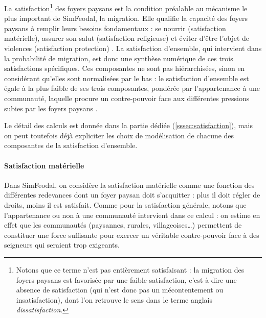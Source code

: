 La satisfaction\footnote{
Notons que ce terme n'est pas entièrement \og satisfaisant\fg{} : la migration des foyers paysans est favorisée par une faible satisfaction, c'est-à-dire une absence de satisfaction (qui n'est donc pas un mécontentement ou \og insatisfaction\fg{}), dont l'on retrouve le sens dans le terme anglais \textit{dissatisfaction}.
} des foyers paysans est la condition préalable au mécanisme le plus important de SimFeodal, la migration.
Elle qualifie la capacité des foyers paysans à remplir leurs besoins fondamentaux : \og se nourrir\fg{} (satisfaction matérielle), \og assurer son salut\fg{} (satisfaction religieuse) et \og éviter d'être l'objet de violences\fg{} (satisfaction \og protection\fg{}) \autocite[Tableau 1, \ppno~309]{cura_transition_2017}.
La satisfaction d'ensemble, qui intervient dans la probabilité de migration, est donc une synthèse numérique de ces trois satisfactions spécifiques.
Ces composantes ne sont pas hiérarchisées, sinon en considérant qu'elles sont normalisées \og par le bas\fg{} : le satisfaction d'ensemble est égale à la plus faible de ses trois composantes, pondérée par l'appartenance à une communauté, laquelle procure un contre-pouvoir face aux différentes pressions subies par les foyers paysans
.

Le détail des calculs est donnée dans la partie dédiée (\cref{sssec:satisfaction}), mais on peut toutefois déjà expliciter les choix de modélisation de chacune des composantes de la satisfaction d'ensemble.

\paragraph{Satisfaction matérielle}

Dans SimFeodal, on considère la satisfaction matérielle comme une fonction des différentes redevances dont un foyer paysan doit s'acquitter : plus il doit régler de droits, moins il est satisfait.
Comme pour la satisfaction générale, notons que l'appartenance ou non à une communauté intervient dans ce calcul : on estime en effet que les communautés (paysannes, rurales, villageoises\ldots) permettent de constituer une force suffisante pour exercer un véritable contre-pouvoir face à des seigneurs qui seraient trop exigeants.

